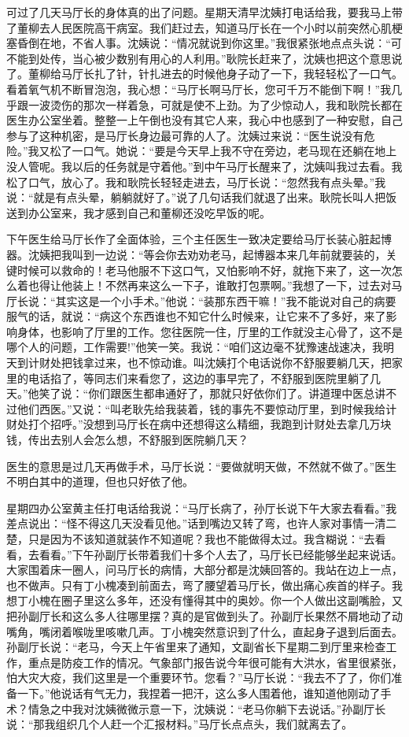 \documentclass[12pt,oneside]{book}
\begin{document}
可过了几天马厅长的身体真的出了问题。星期天清早沈姨打电话给我，要我马上带了董柳去人民医院高干病室。我们赶过去，知道马厅长在一个小时以前突然心肌梗塞昏倒在地，不省人事。沈姨说：``情况就说到你这里。''我很紧张地点点头说：``可不能到处传，当心被少数别有用心的人利用。''耿院长赶来了，沈姨也把这个意思说了。董柳给马厅长扎了针，针扎进去的时候他身子动了一下，我轻轻松了一口气。看着氧气机不断冒泡泡，我心想：``马厅长啊马厅长，您可千万不能倒下啊！''我几乎跟一波烫伤的那次一样着急，可就是使不上劲。为了少惊动人，我和耿院长都在医生办公室坐着。整整一上午倒也没有其它人来，我心中也感到了一种安慰，自己参与了这种机密，是马厅长身边最可靠的人了。沈姨过来说：``医生说没有危险。''我又松了一口气。她说：``要是今天早上我不守在旁边，老马现在还躺在地上没人管呢。我以后的任务就是守着他。''到中午马厅长醒来了，沈姨叫我过去看。我松了口气，放心了。我和耿院长轻轻走进去，马厅长说：``忽然我有点头晕。''我说：``就是有点头晕，躺躺就好了。''说了几句话我们就退了出来。耿院长叫人把饭送到办公室来，我才感到自己和董柳还没吃早饭的呢。

下午医生给马厅长作了全面体验，三个主任医生一致决定要给马厅长装心脏起博器。沈姨把我叫到一边说：``等会你去劝劝老马，起博器本来几年前就要装的，关键时候可以救命的！老马他服不下这口气，又怕影响不好，就拖下来了，这一次怎么着也得让他装上！不然再来这么一下子，谁敢打包票啊。''我想了一下，过去对马厅长说：``其实这是一个小手术。''他说：``装那东西干嘛！''我不能说对自己的病要服气的话，就说：``病这个东西谁也不知它什么时候来，让它来不了多好，来了影响身体，也影响了厅里的工作。您往医院一住，厅里的工作就没主心骨了，这不是哪个人的问题，工作需要!''他笑一笑。我说：``咱们这边毫不犹豫速战速决，我明天到计财处把钱拿过来，也不惊动谁。叫沈姨打个电话说你不舒服要躺几天，把家里的电话掐了，等同志们来看您了，这边的事早完了，不舒服到医院里躺了几天。''他笑了说：``你们跟医生都串通好了，那就只好依你们了。讲道理中医总讲不过他们西医。''又说：``叫老耿先给我装着，钱的事先不要惊动厅里，到时候我给计财处打个招呼。''没想到马厅长在病中还想得这么精细，我跑到计财处去拿几万块钱，传出去别人会怎么想，不舒服到医院躺几天？

医生的意思是过几天再做手术，马厅长说：``要做就明天做，不然就不做了。''医生不明白其中的道理，但也只好依了他。

星期四办公室黄主任打电话给我说：``马厅长病了，孙厅长说下午大家去看看。''我差点说出：``怪不得这几天没看见他。''话到嘴边又转了弯，也许人家对事情一清二楚，只是因为不该知道就装作不知道呢？我也不能做得太过。我含糊说：``去看看，去看看。''下午孙副厅长带着我们十多个人去了，马厅长已经能够坐起来说话。大家围着床一圈人，问马厅长的病情，大部分都是沈姨回答的。我站在边上一点，也不做声。只有丁小槐凑到前面去，弯了腰望着马厅长，做出痛心疾首的样子。我想丁小槐在圈子里这么多年，还没有懂得其中的奥妙。你一个人做出这副嘴脸，又把孙副厅长和这么多人往哪里摆？真的是官做到头了。孙副厅长果然不屑地动了动嘴角，嘴闭着喉咙里咳嗽几声。丁小槐突然意识到了什么，直起身子退到后面去。孙副厅长说：``老马，今天上午省里来了通知，文副省长下星期二到厅里来检查工作，重点是防疫工作的情况。气象部门报告说今年很可能有大洪水，省里很紧张，怕大灾大疫，我们这里是一个重要环节。您看？''马厅长说：``我去不了了，你们准备一下。''他说话有气无力，我捏着一把汗，这么多人围着他，谁知道他刚动了手术？情急之中我对沈姨微微示意一下，沈姨说：``老马你躺下去说话。''孙副厅长说：``那我组织几个人赶一个汇报材料。''马厅长点点头，我们就离去了。
\end{document}
